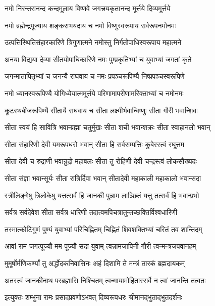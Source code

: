\twolineshloka
{नमो निरन्तरानन्द कन्दमूलाय विष्णवे}
{जगत्त्रयकृतानन्द मूर्त्तये दिव्यमूर्त्तये}%

\twolineshloka
{नमो ब्रह्मेन्द्रपूज्याय शङ्कराभयदाय च}
{नमो विष्णुस्वरूपाय सर्वरूपनमोनमः}%

\twolineshloka
{उत्पत्तिस्थितिसंहारकारिणे त्रिगुणात्मने}
{नमोस्तु निर्गतोपाधिस्वरूपाय महात्मने}%

\twolineshloka
{अनया विद्यया देव्या सीतयोपाधिकारिणे}
{नमः पुम्प्रकृतिभ्यां च युवाभ्यां जगतां कृते}%

\twolineshloka
{जगन्मातापितृभ्यां च जनन्यै राघवाय च}
{नमः प्रपञ्चरूपिण्यै निष्प्रपञ्चस्वरूपिणे}%

\twolineshloka
{नमो ध्यानस्वरूपिण्यै योगिध्येयात्ममूर्त्तये}
{परिणामापरीणामरिक्ताभ्यां च नमोनमः}%

\twolineshloka
{कूटस्थबीजरूपिण्यै सीतायै राघवाय च}
{सीता लक्ष्मीर्भवान्विष्णुः सीता गौरी भवान्शिवः}%

\twolineshloka
{सीता स्वयं हि सावित्रि भवान्ब्रह्मा चतुर्मुखः}
{सीता शची भवान्शक्रः सीता स्वाहानलो भवान्}%

\twolineshloka
{सीता संहारिणी देवी यमरूपधरो भवान्}
{सीता हि सर्वसम्पत्तिः कुबेरस्त्वं रघूत्तम}%

\twolineshloka
{सीता देवी च रुद्राणी भवान्रुद्रो महाबलः}
{सीता तु रोहिणी देवी चन्द्रस्त्वं लोकसौख्यदः}%

\twolineshloka
{सीता संज्ञा भवान्सूर्यः सीता रात्रिर्दिवा भवान्}
{सीतादेवी महाकाली महाकालो भवान्सदा}%

\twolineshloka
{स्त्रीलिङ्गेषु त्रिलोकेषु यत्तत्सर्वं हि जानकी}
{पुन्नाम लाञ्छितं यत्तु तत्सर्वं हि भवान्प्रभो}%

\twolineshloka
{सर्वत्र सर्वदेवेश सीता सर्वत्र धारिणी}
{तदात्वमपिचत्रातुन्तच्छक्तिर्विश्वधारिणी}%

\twolineshloka
{तस्मात्कोटिगुणं पुण्यं युवाभ्यां परिचिह्नितम्}
{चिह्नितं शिवशक्तिभ्यां चरितं तव शान्तिदम्}%

\twolineshloka
{आवां राम जगत्पूज्यौ मम पूज्यौ सदा युवाम्}
{त्वन्नामजापिनी गौरी त्वन्मन्त्रजपवानहम्}%

\twolineshloka
{मुमूर्षोर्मणिकर्ण्यां तु अर्द्धोदकनिवासिनः}
{अहं दिशामि ते मन्त्रं तारकं ब्रह्मदायकम्}%

\twolineshloka
{अतस्त्वं जानकीनाथ परब्रह्मासि निश्चितम्}
{त्वन्मायामोहितास्सर्वे न त्वां जानन्ति तत्वतः}%


\twolineshloka
{इत्युक्तः शम्भुना रामः प्रसादप्रवणोऽभवत्}
{दिव्यरूपधरः श्रीमानद्भुताद्भुतदर्शनः}%

